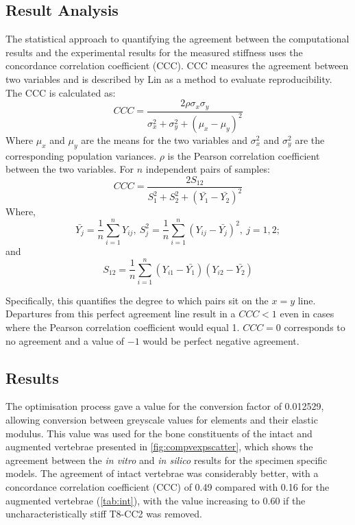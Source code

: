 \subsection{Result Analysis}

The statistical approach to quantifying the agreement between the computational results and the experimental results for the measured stiffness uses the concordance correlation coefficient (CCC).
CCC measures the agreement between two variables and is described by Lin \cite{lawrence1989concordance} as a method to evaluate reproducibility.
The CCC is calculated as:
\begin{equation*}
  CCC = \dfrac{2 \rho \sigma_x \sigma_y}{\sigma_x^2 + \sigma_y^2 + (\mu_x - \mu_y)^2}
 \end{equation*}
Where $\mu_x$ and $\mu_y$ are the means for the two variables and $\sigma_x^2$ and $\sigma_y^2$ are the corresponding population variances.
$\rho$ is the Pearson correlation coefficient between the two variables.
For $n$ independent pairs of samples:
\begin{equation*}
	CCC = \dfrac{2S_{12}}{S_1^2 + S_2^2 + (\bar{Y_1}-\bar{Y_2})^2}
\end{equation*}
Where,
\begin{equation*}
	\bar{Y_j} = \dfrac{1}{n} \sum_{i=1}^{n} Y_{ij},\ S_j^2 = \dfrac{1}{n} \sum_{i=1}^{n} (Y_{ij} - \bar{Y_j})^2,\ j = 1, 2;
\end{equation*}
and
\begin{equation*}
S_{12} = \dfrac{1}{n} \sum_{i=1}^{n} (Y_{i1} - \bar{Y_1})(Y_{i2} - \bar{Y_2})
\end{equation*}

Specifically, this quantifies the degree to which pairs sit on the $x=y$ line.
Departures from this perfect agreement line result in a $CCC < 1$ even in cases where the Pearson correlation coefficient would equal 1.
$CCC = 0$ corresponds to no agreement and a value of $-1$ would be perfect negative agreement.



\subsection{Results} \label{bov:results}

The optimisation process gave a value for the conversion factor of 0.012529, allowing conversion between greyscale values for elements and their elastic modulus. This value was used for the bone constituents of the intact and augmented vertebrae presented in \cref{fig:compvexpscatter}, which shows the agreement between the \textit{in vitro} and \textit{in silico} results for the specimen specific models. The agreement of intact vertebrae was considerably better, with a concordance
correlation coefficient (CCC) of 0.49 compared with 0.16 for the augmented vertebrae (\cref{tab:int}), with the value increasing to 0.60 if the uncharacteristically stiff T8-CC2 was removed.

